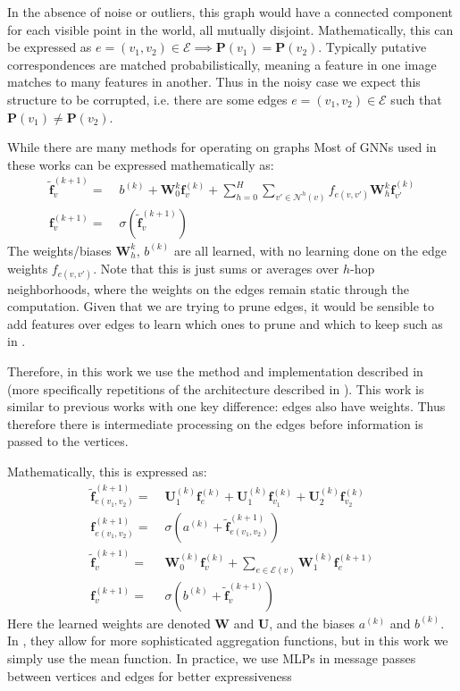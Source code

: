\documentclass[10pt,twocolumn,letterpaper]{article}
\newcommand{\mat}[1]{\mathbf{#1}}
\begin{document}
In the absence of noise or outliers, this graph would have a connected component for each visible point in the world, all mutually disjoint.
Mathematically, this can be expressed as $e = (v_1, v_2) \in \mathcal{E} \implies \mat{P}(v_1) = \mat{P}(v_2)$.
Typically putative correspondences are matched probabilistically, meaning a feature in one image matches to many features in another.
Thus in the noisy case we expect this structure to be corrupted, i.e. there are some edges $e = (v_1, v_2) \in \mathcal{E}$ such that $\mat{P}(v_1) \neq \mat{P}(v_2)$.

While there are many methods for operating on graphs \cite{bronstein2017geometric, bruna2013spectral, defferrard2016convolutional, kipf2017semi, scarselli2009graph, gama2018mimo, gama2018convolutional, battaglia2018relational}
Most of GNNs used in these works can be expressed mathematically as:
\begin{align*}
\mat{\tilde{f}}_v^{(k+1)} =&\; b^{(k)} + \mat{W}_0^{k} \mat{f}_{v}^{(k)} + \sum_{h=0}^H \sum_{v' \in \mathcal{N}^{h}(v)} f_{e(v,v')} \mat{W}_{h}^{k} \mat{f}_{v'}^{(k)} \\
\mat{f}_v^{(k+1)} =&\; \sigma\left(\mat{\tilde{f}}_v^{(k+1)}\right)
\end{align*}
The weights/biases $\mat{W}_{h}^{k}$, $b^{(k)}$ are all learned, with no learning done on the edge weights $f_{e(v,v')}$. 
Note that this is just sums or averages over $h$-hop neighborhoods, where the weights on the edges remain static through the computation.
Given that we are trying to prune edges, it would be sensible to add features over edges to learn which ones to prune and which to keep such as in \cite{scarselli2009graph}.

Therefore, in this work we use the method and implementation described in \cite{battaglia2018relational} (more specifically repetitions of the architecture described in \cite{battaglia2016interaction}).
This work is similar to previous works with one key difference: edges also have weights.
Thus therefore there is intermediate processing on the edges before information is passed to the vertices. 

Mathematically, this is expressed as: %
\begin{align}
\mat{\tilde{f}}_{e(v_1,v_2)}^{(k+1)} =&\; \mat{U}_1^{(k)} \mat{f}_{e}^{(k)} + \mat{U}_1^{(k)} \mat{f}_{v_1}^{(k)} + \mat{U}_2^{(k)} \mat{f}_{v_2}^{(k)} \\
\mat{f}_{e(v_1,v_2)}^{(k+1)} =&\; \sigma \left(a^{(k)} + \mat{\tilde{f}}_{e(v_1,v_2)}^{(k+1)}\right) \\
\mat{\tilde{f}}_{v}^{(k+1)} =&\; \mat{W}_0^{(k)} \mat{f}_{v}^{(k)} + \sum_{e \in \mathcal{E}(v)} \mat{W}_1^{(k)} \mat{f}_{e}^{(k+1)} \\
\mat{f}_v^{(k+1)} =&\; \sigma\left(b^{(k)} + \mat{\tilde{f}}_v^{(k+1)}\right)
\end{align}
Here the learned weights are denoted $\mat{W}$ and $\mat{U}$, and the biases $a^{(k)}$ and  $b^{(k)}$.
In \cite{battaglia2018relational}, they allow for more sophisticated aggregation functions, but in this work we simply use the mean function.
In practice, we use MLPs in message passes between vertices and edges for better expressiveness
\end{document}
